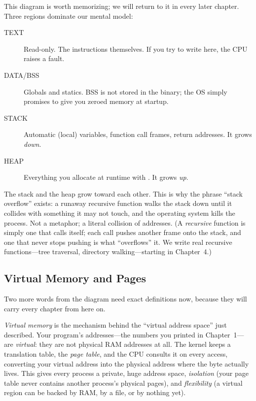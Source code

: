 This diagram is worth memorizing; we will return to it in every later
chapter. Three regions dominate our mental model:

\begin{description}
  \item[TEXT] Read-only. The instructions themselves. If you try to write
    here, the CPU raises a fault.
  \item[DATA/BSS] Globals and statics. BSS is not stored in the binary;
    the OS simply promises to give you zeroed memory at startup.
  \item[STACK] Automatic (local) variables, function call frames, return
    addresses. It grows \emph{down}.
  \item[HEAP] Everything you allocate at runtime with .
    It grows \emph{up}.
\end{description}

The stack and the heap grow toward each other. This is why the phrase
``stack overflow'' exists: a runaway recursive function walks the stack
down until it collides with something it may not touch, and the
operating system kills the process. Not a metaphor; a literal collision
of addresses. (A \emph{recursive} function is simply one that calls
itself; each call pushes another frame onto the stack, and one that
never stops pushing is what ``overflows'' it. We write real recursive
functions---tree traversal, directory walking---starting in
Chapter~4.)

\subsection{Virtual Memory and Pages}

Two more words from the diagram need exact definitions now, because
they will carry every chapter from here on.

\emph{Virtual memory} is the mechanism behind the ``virtual address
space'' just described. Your program's addresses---the 
numbers you printed in Chapter~1---are \emph{virtual}: they are not
physical RAM addresses at all. The kernel keeps a translation table,
the \emph{page table}, and the CPU consults it on every access,
converting your virtual address into the physical address where the
byte actually lives. This gives every process a private, huge address
space, \emph{isolation} (your page table never contains another
process's physical pages), and \emph{flexibility} (a virtual region can
be backed by RAM, by a file, or by nothing yet).

